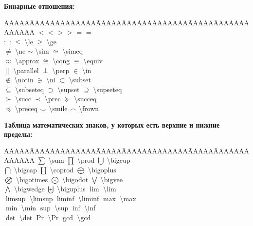 \documentclass[a4paper,14pt,russian]{extreport}
\begin{document}
\textbf{Бинарные отношения:}
\begin{tabbing}
AAAAA\= AAAAAAAAAAAAA\= AAAAA\= AAAAAAAAAAAAA\= AAAAA\= AAAAAAAAAAAAA \kill
$<$ \> < \> $>$ \> > \> $=$ \> = \\
$:$ \> : \> $\le$ \> \textbackslash le \> $\ge$ \> \textbackslash ge \\
$\ne$ \> \textbackslash ne \> $\sim$ \> \textbackslash sim \> $\simeq$ \> \textbackslash simeq\\
$\approx$ \> \textbackslash approx \> $\cong$ \> \textbackslash cong \> $\equiv$ \> \textbackslash  equiv\\
$\parallel$ \> \textbackslash parallel \> $\perp$ \> \textbackslash perp \> $\in$ \> \textbackslash in\\
$\notin$ \> \textbackslash notin \> $\ni$ \> \textbackslash ni \> $\subset$ \> \textbackslash subset \\
$\subseteq$ \> \textbackslash subseteq \> $\supset$ \> \textbackslash supset \> $\supseteq$ \>  \textbackslash supseteq\\
$\succ$ \> \textbackslash succ \> $\prec$ \> \textbackslash prec \> $\succeq$ \> \textbackslash succeq \\
$\preceq$ \> \textbackslash preceq \> $\smile$ \> \textbackslash smile \> $\frown$ \> \textbackslash frown
\end{tabbing}

\textbf{Таблица математических знаков, у которых есть верхние и нижние пределы:}
\begin{tabbing}
AAAAA\= AAAAAAAAAAAAA\= AAAAA\= AAAAAAAAAAAAA\= AAAAA\= AAAAAAAAAAAAA \kill
$\sum$ \> \textbackslash sum \> $\prod$ \> \textbackslash prod \> $\bigcup$ \> \textbackslash bigcup\\
$\bigcap$ \> \textbackslash bigcap \> $\coprod$ \> \textbackslash coprod \> $\bigoplus$ \> \textbackslash bigoplus \\
$\bigotimes$ \> \textbackslash bigotimes \> $\bigodot$ \> \textbackslash bigodot \> $\bigvee$ \> \textbackslash bigvee\\
$\bigwedge$ \> \textbackslash bigwedge \> $\biguplus$ \> \textbackslash biguplus \> $\lim$ \> \textbackslash lim\\
$\limsup$ \> \textbackslash limsup \> $\liminf$ \> \textbackslash liminf \> $\max$ \> \textbackslash max\\
$\min$ \> \textbackslash min \> $\sup$ \> \textbackslash sup \> $\inf$ \>\textbackslash inf \\
$\det$ \> \textbackslash det \> $\Pr$ \> \textbackslash Pr \> $\gcd$ \> \textbackslash gcd
\end{tabbing}
\end{document}
